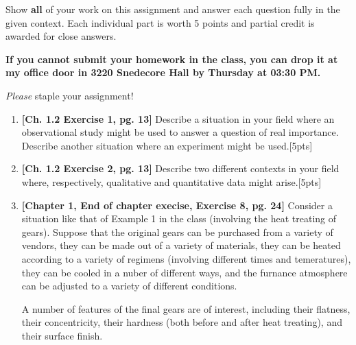 \documentclass[11pt]{article}\usepackage[]{graphicx}\usepackage[]{color}
\begin{document}
\pagestyle{fancy} 

Show \textbf{all} of your work on this assignment and answer each question fully in the given context. 
Each individual part is worth 5 points and partial credit is awarded for close answers.
\vspace{0.3cm}

\textbf{If you cannot submit your homework in the class, you can drop it at my office door in 3220 Snedecore Hall by Thursday at 03:30 PM.}

\vspace{0.3cm}
\emph{Please} staple your assignment!

\begin{enumerate}

\item \textbf{[Ch. 1.2 Exercise 1, pg. 13]} Describe a situation in your field where an observational study might be used to answer a question of real importance. Describe another situation where an experiment might be used.[5pts]

\item \textbf{[Ch. 1.2 Exercise 2, pg. 13]} Describe two different contexts in your field where, respectively, qualitative and quantitative data might arise.[5pts] 

\item \textbf{ [Chapter 1, End of chapter execise, Exercise 8, pg. 24]} Consider a situation like that of Example 1 in the class (involving the heat treating of gears). Suppose that the original gears can be purchased from a variety of vendors, they can be made out of a variety of materials, they can be heated according to a variety of regimens (involving different times and temeratures), they can be cooled in a nuber of different ways, and the furnance atmosphere can be adjusted to a variety of different conditions. 

A number of features of the final gears are of interest, including their flatness, their concentricity, their hardness (both before and after heat treating), and their surface finish. 


\end{enumerate}
\end{document}
